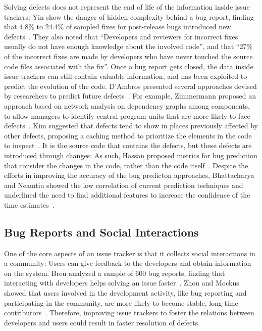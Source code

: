 Solving defects does not represent the end of life of the information inside issue trackers: Yin \etal show the danger of hidden complexity behind a bug report, finding that 4.8\% to 24.4\% of sampled fixes for post-release bugs introduced new defects~\cite{Yin2011a}.
They also noted that ``Developers and reviewers for incorrect fixes usually do not have enough knowledge about the involved code'', and that ``27\% of the incorrect fixes are made by developers who have never touched the source code files associated with the fix''.
Once a bug report gets closed, the data inside issue trackers can still contain valuable information, and has been exploited to predict the evolution of the code.
D'Ambros \etal presented several approaches devised by researchers to predict future defects~\cite{DAmb2012a}.
For example, Zimmermann \etal proposed an approach based on network analysis on dependency graphs among components, to allow managers to identify central program units that are more likely to face defects~\cite{Zimm2008a}.
Kim \etal suggested that defects tend to show in places previously affected by other defects, proposing a caching method to prioritize the elements in the code to inspect~\cite{Kim2007a}.
It is the source code that contains the defects, but these defects are introduced through changes: As such, Hassan \etal proposed metrics for bug prediction that consider the changes in the code, rather than the code itself~\cite{Hass2009a}.
Despite the efforts in improving the accuracy of the bug predicton approaches, Bhattacharya and Neamtiu showed the low correlation of current prediction techniques and underlined the need to find additional features to increase the confidence of the time estimates~\cite{Bhat2011}.


\subsection{Bug Reports and Social Interactions}

One of the core aspects of an issue tracker is that it collects social interactions in a community: Users can give feedback to the developers and obtain information on the system.
Breu \etal analyzed a sample of 600 bug reports, finding that interacting with developers helps solving an issue faster~\cite{Breu2010}.
Zhou and Mockus showed that users involved in the development activity, like bug reporting and participating in the community, are more likely to become stable, long time contributors~\cite{Zhou2015}.
Therefore, improving issue trackers to foster the relations between developers and users could result in faster resolution of defects.



